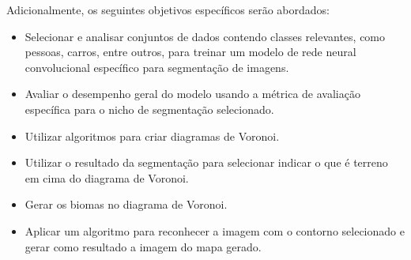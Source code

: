 Adicionalmente, os seguintes objetivos específicos serão abordados:

\begin{itemize}
	\item Selecionar e analisar conjuntos de dados contendo classes relevantes, como pessoas, carros, entre outros, para treinar um modelo de rede neural convolucional específico para segmentação de imagens.
	\item Avaliar o desempenho geral do modelo usando a métrica de avaliação específica para o nicho de segmentação selecionado.
	\item Utilizar algoritmos para criar diagramas de Voronoi.
	\item Utilizar o resultado da segmentação para selecionar indicar o que é terreno em cima do diagrama de Voronoi.
	\item Gerar os biomas no diagrama de Voronoi.
	\item Aplicar um algoritmo para reconhecer a imagem com o contorno selecionado e gerar como resultado a imagem do mapa gerado.
\end{itemize}

